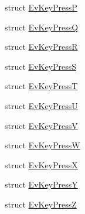 \begin{DoxyCompactItemize}
\item 
struct \hyperlink{structkeyboard__client_1_1EvKeyPressP}{Ev\+Key\+PressP}
\item 
struct \hyperlink{structkeyboard__client_1_1EvKeyPressQ}{Ev\+Key\+PressQ}
\item 
struct \hyperlink{structkeyboard__client_1_1EvKeyPressR}{Ev\+Key\+PressR}
\item 
struct \hyperlink{structkeyboard__client_1_1EvKeyPressS}{Ev\+Key\+PressS}
\item 
struct \hyperlink{structkeyboard__client_1_1EvKeyPressT}{Ev\+Key\+PressT}
\item 
struct \hyperlink{structkeyboard__client_1_1EvKeyPressU}{Ev\+Key\+PressU}
\item 
struct \hyperlink{structkeyboard__client_1_1EvKeyPressV}{Ev\+Key\+PressV}
\item 
struct \hyperlink{structkeyboard__client_1_1EvKeyPressW}{Ev\+Key\+PressW}
\item 
struct \hyperlink{structkeyboard__client_1_1EvKeyPressX}{Ev\+Key\+PressX}
\item 
struct \hyperlink{structkeyboard__client_1_1EvKeyPressY}{Ev\+Key\+PressY}
\item 
struct \hyperlink{structkeyboard__client_1_1EvKeyPressZ}{Ev\+Key\+PressZ}
\end{DoxyCompactItemize}
